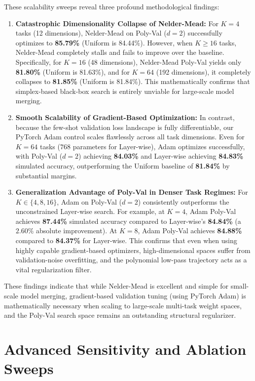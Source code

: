 \documentclass{article}
\theoremstyle{plain}
\theoremstyle{definition}
\theoremstyle{remark}
\begin{document}
These scalability sweeps reveal three profound methodological findings:
\begin{enumerate}
    \item \textbf{Catastrophic Dimensionality Collapse of Nelder-Mead:} For $K=4$ tasks (12 dimensions), Nelder-Mead on Poly-Val ($d=2$) successfully optimizes to \textbf{85.79\%} (Uniform is 84.44\%). However, when $K \ge 16$ tasks, Nelder-Mead completely stalls and fails to improve over the baseline. Specifically, for $K=16$ (48 dimensions), Nelder-Mead Poly-Val yields only \textbf{81.80\%} (Uniform is 81.63\%), and for $K=64$ (192 dimensions), it completely collapses to \textbf{81.85\%} (Uniform is 81.84\%). This mathematically confirms that simplex-based black-box search is entirely unviable for large-scale model merging.
    \item \textbf{Smooth Scalability of Gradient-Based Optimization:} In contrast, because the few-shot validation loss landscape is fully differentiable, our PyTorch Adam control scales flawlessly across all task dimensions. Even for $K=64$ tasks ($768$ parameters for Layer-wise), Adam optimizes successfully, with Poly-Val ($d=2$) achieving \textbf{84.03\%} and Layer-wise achieving \textbf{84.83\%} simulated accuracy, outperforming the Uniform baseline of \textbf{81.84\%} by substantial margins.
    \item \textbf{Generalization Advantage of Poly-Val in Denser Task Regimes:} For $K \in \{4, 8, 16\}$, Adam on Poly-Val ($d=2$) consistently outperforms the unconstrained Layer-wise search. For example, at $K=4$, Adam Poly-Val achieves \textbf{87.44\%} simulated accuracy compared to Layer-wise's \textbf{84.84\%} (a $2.60\%$ absolute improvement). At $K=8$, Adam Poly-Val achieves \textbf{84.88\%} compared to \textbf{84.37\%} for Layer-wise. This confirms that even when using highly capable gradient-based optimizers, high-dimensional spaces suffer from validation-noise overfitting, and the polynomial low-pass trajectory acts as a vital regularization filter.
\end{enumerate}

These findings indicate that while Nelder-Mead is excellent and simple for small-scale model merging, gradient-based validation tuning (using PyTorch Adam) is mathematically necessary when scaling to large-scale multi-task weight spaces, and the Poly-Val search space remains an outstanding structural regularizer.

\newpage
\section{Advanced Sensitivity and Ablation Sweeps}
\label{appendix:ablations}
\end{document}
